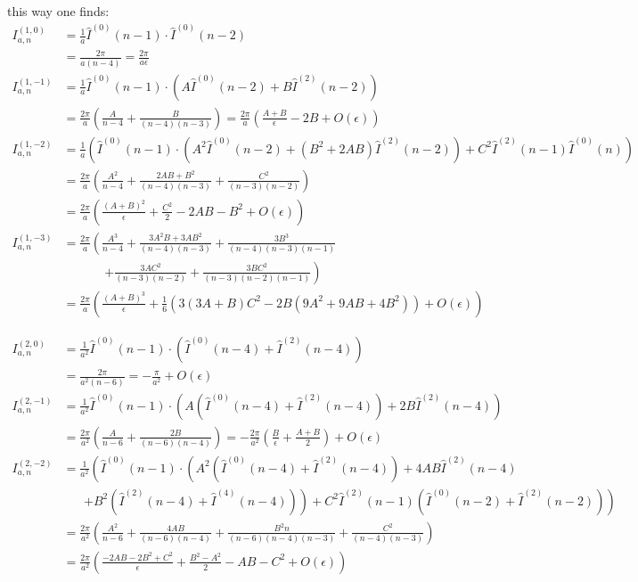 this way one finds\cite[Ch. 5]{Bojak:2000eu}\cite[App. C]{PhysRevD.40.54}:
\begin{align}
I^{(1,0)}_{a,n} &= \frac 1 a\hat I^{(0)}(n-1) \cdot \hat I^{(0)}(n-2)\\
 &= \frac {2\pi}{a(n-4)} = \frac {2\pi}{a\epsilon}\\
I^{(1,-1)}_{a,n} &= \frac 1 a\hat I^{(0)}(n-1)\cdot \left(A\hat I^{(0)}(n-2)+B\hat I^{(2)}(n-2)\right)\\
 &= \frac {2\pi}{a}\left(\frac{A}{n-4}+\frac{B}{(n-4)(n-3)}\right) = \frac {2\pi}{a}\left(\frac{A+B}\epsilon - 2B + O(\epsilon)\right)\\
I^{(1,-2)}_{a,n} &= \frac 1 a\left(\hat I^{(0)}(n-1)\cdot \left(A^2\hat I^{(0)}(n-2)+(B^2+2AB)\hat I^{(2)}(n-2)\right) + C^2\hat I^{(2)}(n-1)\hat I^{(0)}(n)\right)\\
 &= \frac {2\pi}{a}\left(\frac {A^2}{n-4} + \frac {2AB + B^2}{(n-4)(n-3)} + \frac {C^2}{(n-3)(n-2)}\right)\\
 &= \frac {2\pi}{a}\left(\frac{(A+B)^2}{\epsilon}+\frac{C^2}{2}-2AB-B^2+O(\epsilon)\right)\\
I^{(1,-3)}_{a,n} &= \frac {2\pi} a \left(\frac{A^3}{n-4}+\frac{3A^2B+3AB^2}{(n-4)(n-3)}+\frac{3B^3}{(n-4)(n-3)(n-1)}\right.\nonumber\\
 &\hspace{40pt} \left.+\frac{3AC^2}{(n-3)(n-2)}+\frac{3BC^2}{(n-3)(n-2)(n-1)}\right)\\
 &= \frac {2\pi}{a}\left(\frac{(A+B)^3}{\epsilon} + \frac 1 6 \left( 3(3A+B)C^2 - 2B(9A^2+9AB+4B^2) \right) + O(\epsilon)\right)
\end{align}

\begin{align}
I^{(2,0)}_{a,n} &= \frac 1 {a^2}\hat I^{(0)}(n-1) \cdot \left(\hat I^{(0)}(n-4) + \hat I^{(2)}(n-4)\right)\\
 &= \frac {2\pi}{a^2(n-6)}
  = -\frac {\pi}{a^2} + O(\epsilon)\\
I^{(2,-1)}_{a,n} &= \frac 1 {a^2}\hat I^{(0)}(n-1) \cdot \left(A\left(\hat I^{(0)}(n-4) + \hat I^{(2)}(n-4)\right) + 2B\hat I^{(2)}(n-4)\right)\\
 &= \frac {2\pi}{a^2}\left(\frac{A}{n-6}+\frac{2B}{(n-6)(n-4)}\right)
  = -\frac{2\pi}{a^2}\left(\frac{B}{\epsilon} + \frac{A+B} 2\right) + O(\epsilon)\\
I^{(2,-2)}_{a,n} &= \frac 1 {a^2}\left(\hat I^{(0)}(n-1)\cdot \left(A^2(\hat I^{(0)}(n-4)+\hat I^{(2)}(n-4))+4AB\hat I^{(2)}(n-4) \right.\right.\nonumber\\
 &\hspace{20pt}\left.\left. + B^2(\hat I^{(2)}(n-4)+\hat I^{(4)}(n-4))\right) + C^2\hat I^{(2)}(n-1)(\hat I^{(0)}(n-2) + \hat I^{(2)}(n-2))\right)\\
 &= \frac {2\pi}{a^2}\left(\frac {A^2}{n-6}+\frac{4AB}{(n-6)(n-4)} + \frac{B^2 n}{(n-6)(n-4)(n-3)} + \frac{C^2}{(n-4)(n-3)} \right) \\
 &= \frac {2\pi}{a^2}\left(\frac{-2AB-2B^2+C^2}{\epsilon}+\frac{B^2-A^2}{2}-AB-C^2+O(\epsilon)\right)\\
\end{align}

